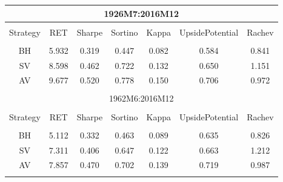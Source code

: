 
\begin{tabular}{@{\extracolsep{5pt}} ccccccc} 
\multicolumn{7}{c}{1926M7:2016M12}\\
\hline \\[-1.8ex] 
 Strategy & RET & Sharpe & Sortino & Kappa & UpsidePotential & Rachev \\ 
\hline \\[-1.8ex] 
BH & 5.932 & 0.319 & 0.447 & 0.082 & 0.584 & 0.841 \\ 
SV & 8.598 & 0.462 & 0.722 & 0.132 & 0.650 & 1.151 \\ 
AV & 9.677 & 0.520 & 0.778 & 0.150 & 0.706 & 0.972 \\ 
\hline \\[-1.8ex]
\multicolumn{7}{c}{1962M6:2016M12}\\
\hline \\[-1.8ex] 
Strategy & RET & Sharpe & Sortino & Kappa & UpsidePotential & Rachev \\ 
\hline \\[-1.8ex] 
BH & 5.112 & 0.332 & 0.463 & 0.089 & 0.635 & 0.826 \\ 
SV & 7.311 & 0.406 & 0.647 & 0.122 & 0.663 & 1.212 \\ 
AV & 7.857 & 0.470 & 0.702 & 0.139 & 0.719 & 0.987 \\ 
\hline \\[-1.8ex] 
\end{tabular} 
